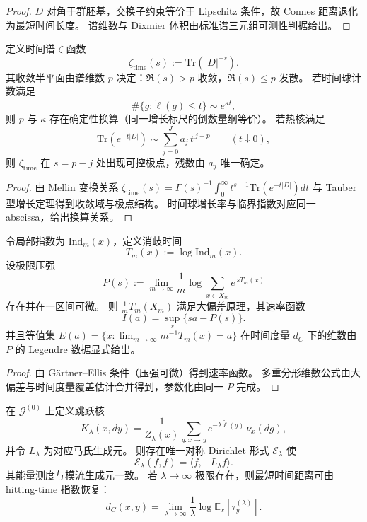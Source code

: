 \begin{proof}
\(D\) 对角于群胚基，交换子约束等价于 Lipschitz 条件，故 Connes 距离退化为最短时间长度。
谱维数与 Dixmier 体积由标准谱三元组可测性判据给出。
\end{proof}

\begin{theorem}\label{thm:xi-time-zeta-singularity-from-growth}
定义时间谱 \(\zeta\)-函数
\[
\zeta_{\mathrm{time}}(s):=\mathrm{Tr}(|D|^{-s}).
\]
其收敛半平面由谱维数 \(p\) 决定：\(\Re(s)>p\) 收敛，\(\Re(s)\le p\) 发散。
若时间球计数满足
\[
\#\{g:\widetilde\ell(g)\le t\}\sim e^{\kappa t},
\]
则 \(p\) 与 \(\kappa\) 存在确定性换算（同一增长标尺的倒数量纲等价）。
若热核满足
\[
\mathrm{Tr}(e^{-t|D|})
\sim
\sum_{j=0}^{J}a_j\,t^{\,j-p}
\qquad(t\downarrow 0),
\]
则 \(\zeta_{\mathrm{time}}\) 在 \(s=p-j\) 处出现可控极点，残数由 \(a_j\) 唯一确定。
\end{theorem}

\begin{proof}
由 Mellin 变换关系
\(
\zeta_{\mathrm{time}}(s)=\Gamma(s)^{-1}\int_0^\infty t^{s-1}\mathrm{Tr}(e^{-t|D|})dt
\)
与 Tauber 型增长定理得到收敛域与极点结构。
时间球增长率与临界指数对应同一 abscissa，给出换算关系。
\end{proof}

\begin{theorem}[纤维时间的多重分形律由压强函数唯一确定]\label{thm:xi-fiber-time-multifractal-legendre}
令局部指数为 \(\mathrm{Ind}_m(x)\)，定义消歧时间
\[
T_m(x):=\log \mathrm{Ind}_m(x).
\]
设极限压强
\[
P(s):=\lim_{m\to\infty}\frac1m\log\sum_{x\in X_m}e^{\,sT_m(x)}
\]
存在并在一区间可微。
则 \(\frac1mT_m(X_m)\) 满足大偏差原理，其速率函数
\[
I(a)=\sup_s\{sa-P(s)\}.
\]
并且等值集
\(
E(a)=\{x:\lim_{m\to\infty}m^{-1}T_m(x)=a\}
\)
在时间度量 \(d_C\) 下的维数由 \(P\) 的 Legendre 数据显式给出。
\end{theorem}

\begin{proof}
由 G\"artner--Ellis 条件（压强可微）得到速率函数。
多重分形维数公式由大偏差与时间度量覆盖估计合并得到，参数化由同一 \(P\) 完成。
\end{proof}

\begin{theorem}\label{thm:xi-time-induced-dirichlet-form}
在 \(\mathcal G^{(0)}\) 上定义跳跃核
\[
K_\lambda(x,dy)
=
\frac{1}{Z_\lambda(x)}
\sum_{g:x\to y}
e^{-\lambda\widetilde\ell(g)}\,\nu_x(dg),
\]
并令 \(L_\lambda\) 为对应马氏生成元。
则存在唯一对称 Dirichlet 形式 \(\mathcal E_\lambda\) 使
\[
\mathcal E_\lambda(f,f)=\langle f,-L_\lambda f\rangle.
\]
其能量测度与模流生成元一致。
若 \(\lambda\to\infty\) 极限存在，则最短时间距离可由 hitting-time 指数恢复：
\[
d_C(x,y)
=
\lim_{\lambda\to\infty}
\frac{1}{\lambda}\log\mathbb E_x[\tau_y^{(\lambda)}].
\]
\end{theorem}

